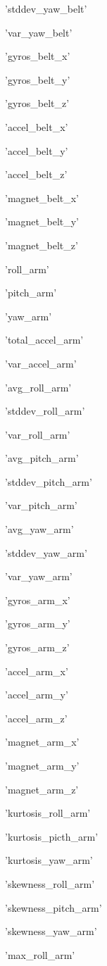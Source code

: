 \documentclass{article}
\begin{document}
\begin{enumerate*}
\item 'stddev\_yaw\_belt'
\item 'var\_yaw\_belt'
\item 'gyros\_belt\_x'
\item 'gyros\_belt\_y'
\item 'gyros\_belt\_z'
\item 'accel\_belt\_x'
\item 'accel\_belt\_y'
\item 'accel\_belt\_z'
\item 'magnet\_belt\_x'
\item 'magnet\_belt\_y'
\item 'magnet\_belt\_z'
\item 'roll\_arm'
\item 'pitch\_arm'
\item 'yaw\_arm'
\item 'total\_accel\_arm'
\item 'var\_accel\_arm'
\item 'avg\_roll\_arm'
\item 'stddev\_roll\_arm'
\item 'var\_roll\_arm'
\item 'avg\_pitch\_arm'
\item 'stddev\_pitch\_arm'
\item 'var\_pitch\_arm'
\item 'avg\_yaw\_arm'
\item 'stddev\_yaw\_arm'
\item 'var\_yaw\_arm'
\item 'gyros\_arm\_x'
\item 'gyros\_arm\_y'
\item 'gyros\_arm\_z'
\item 'accel\_arm\_x'
\item 'accel\_arm\_y'
\item 'accel\_arm\_z'
\item 'magnet\_arm\_x'
\item 'magnet\_arm\_y'
\item 'magnet\_arm\_z'
\item 'kurtosis\_roll\_arm'
\item 'kurtosis\_picth\_arm'
\item 'kurtosis\_yaw\_arm'
\item 'skewness\_roll\_arm'
\item 'skewness\_pitch\_arm'
\item 'skewness\_yaw\_arm'
\item 'max\_roll\_arm'

\end{enumerate*}
\end{document}
